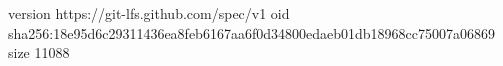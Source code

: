 version https://git-lfs.github.com/spec/v1
oid sha256:18e95d6c29311436ea8feb6167aa6f0d34800edaeb01db18968cc75007a06869
size 11088
